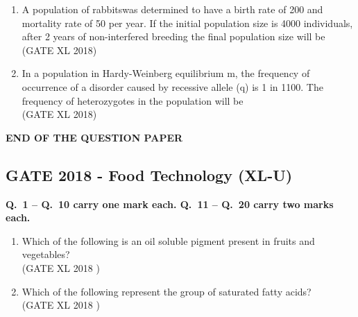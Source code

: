 \documentclass[14pt]{extarticle}
\begin{document}
\begin{flushleft}
\begin{enumerate}
\item A population of rabbitswas determined to have a birth rate of 200 and mortality rate of 50 per year. If the initial population size is 4000 individuals, after 2 years of non-interfered breeding the final population size will be \underline{\hspace{3cm}} 
\hfill(GATE XL 2018)\\

\item In a population in Hardy-Weinberg equilibrium m, the frequency of occurrence of a disorder caused by recessive allele (q) is 1 in 1100. The frequency of heterozygotes in the population will be  \underline{\hspace{3cm}} \\
\hfill(GATE XL 2018)

\end{enumerate}
\begin{center}
    \textbf{END OF THE QUESTION PAPER}
\end{center}
\clearpage


\begin{center}
 \section*{GATE 2018 - Food Technology (XL-U)}
 \end{center}
 
\textbf{Q.~1 -- Q.~10 carry one mark each. Q.~11 -- Q.~20 carry two marks each.}\\

\begin{enumerate}
\item Which of the following is an oil soluble pigment present in fruits and vegetables?\\
\hfill(GATE XL 2018 )\\
\begin{enumerate}[label=(\Alph*)]
\end{enumerate}

\item Which of the following represent the group of saturated fatty acids?\\
\hfill(GATE XL 2018 )\\
\begin{enumerate}[label=(\Alph*)]
\end{enumerate}


\end{enumerate}
\end{flushleft}
\end{document}

